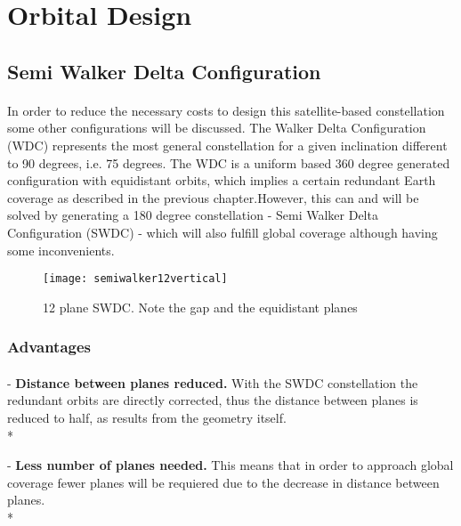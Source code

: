 \documentclass{article}
\begin{document}
\section{Orbital Design}


\subsection{Semi Walker Delta Configuration}
\paragraph{ }

In order to reduce the necessary costs to design this satellite-based constellation some other configurations will be discussed. The Walker Delta Configuration (WDC) represents the most general constellation for a given inclination different to 90 degrees, i.e. 75 degrees. The WDC is a uniform based 360 degree generated configuration with equidistant orbits, which implies a certain redundant Earth coverage as described in the previous chapter.However, this can and will be solved by generating a 180 degree constellation - Semi Walker Delta Configuration (SWDC) - which will also fulfill global coverage although having some inconvenients. 

\begin{figure}[h]
\texttt{[image: semiwalker12vertical]}
\centering
\caption{12 plane SWDC. Note the gap and the equidistant planes}
\end{figure}



\subsubsection{Advantages}\vfill

\paragraph{   }


-	\textbf{Distance between planes reduced.} With the SWDC constellation the redundant orbits are directly corrected, thus the distance between planes is reduced to half, as results from the geometry itself. \\*

-	\textbf{Less number of planes needed.} This means that in order to approach global coverage fewer planes will be requiered due to the decrease in distance between planes.\\*
 
\end{document}
